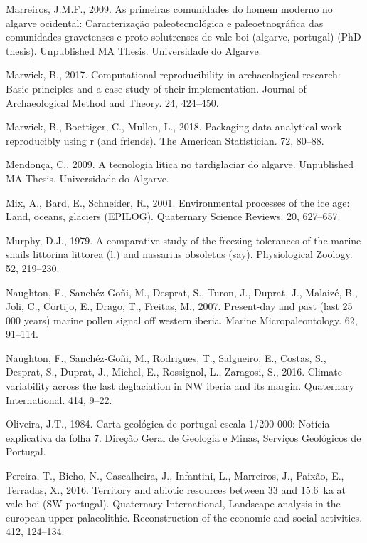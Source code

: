 \documentclass[12pt,twoside]{reedthesis}
\begin{document}
\leavevmode\hypertarget{ref-marreiros2009}{}%
Marreiros, J.M.F., 2009. As primeiras comunidades do homem moderno no algarve ocidental: Caracterização paleotecnológica e paleoetnográfica das comunidades gravetenses e proto-solutrenses de vale boi (algarve, portugal) (PhD thesis). Unpublished MA Thesis. Universidade do Algarve.

\leavevmode\hypertarget{ref-marwick2017}{}%
Marwick, B., 2017. Computational reproducibility in archaeological research: Basic principles and a case study of their implementation. Journal of Archaeological Method and Theory. 24, 424--450.

\leavevmode\hypertarget{ref-marwick2018}{}%
Marwick, B., Boettiger, C., Mullen, L., 2018. Packaging data analytical work reproducibly using r (and friends). The American Statistician. 72, 80--88.

\leavevmode\hypertarget{ref-mendonca2009}{}%
Mendonça, C., 2009. A tecnologia lítica no tardiglaciar do algarve. Unpublished MA Thesis. Universidade do Algarve.

\leavevmode\hypertarget{ref-mix2001}{}%
Mix, A., Bard, E., Schneider, R., 2001. Environmental processes of the ice age: Land, oceans, glaciers (EPILOG). Quaternary Science Reviews. 20, 627--657.

\leavevmode\hypertarget{ref-murphy1979}{}%
Murphy, D.J., 1979. A comparative study of the freezing tolerances of the marine snails littorina littorea (l.) and nassarius obsoletus (say). Physiological Zoology. 52, 219--230.

\leavevmode\hypertarget{ref-naughton2007}{}%
Naughton, F., Sanchéz-Goñi, M., Desprat, S., Turon, J., Duprat, J., Malaizé, B., Joli, C., Cortijo, E., Drago, T., Freitas, M., 2007. Present-day and past (last 25 000 years) marine pollen signal off western iberia. Marine Micropaleontology. 62, 91--114.

\leavevmode\hypertarget{ref-naughton2016}{}%
Naughton, F., Sanchéz-Goñi, M., Rodrigues, T., Salgueiro, E., Costas, S., Desprat, S., Duprat, J., Michel, E., Rossignol, L., Zaragosi, S., 2016. Climate variability across the last deglaciation in NW iberia and its margin. Quaternary International. 414, 9--22.

\leavevmode\hypertarget{ref-oliveira1984}{}%
Oliveira, J.T., 1984. Carta geológica de portugal escala 1/200 000: Notícia explicativa da folha 7. Direção Geral de Geologia e Minas, Serviços Geológicos de Portugal.

\leavevmode\hypertarget{ref-pereira2016}{}%
Pereira, T., Bicho, N., Cascalheira, J., Infantini, L., Marreiros, J., Paixão, E., Terradas, X., 2016. Territory and abiotic resources between 33 and 15.6~ka at vale boi (SW portugal). Quaternary International, Landscape analysis in the european upper palaeolithic. Reconstruction of the economic and social activities. 412, 124--134.
\end{document}
